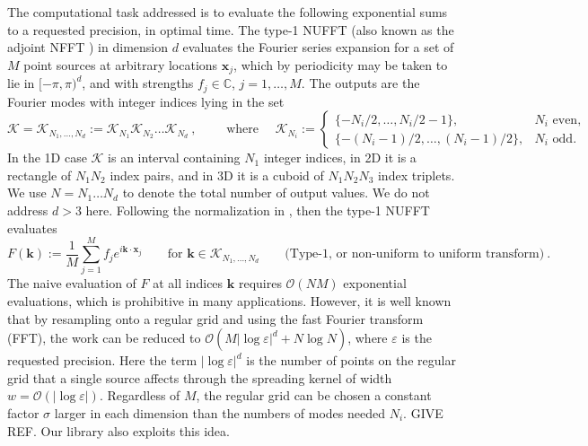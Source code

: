 \documentclass[10pt]{article}
\newcommand{\be}{\begin{equation}}
\newcommand{\ee}{\end{equation}}
\newcommand{\mbf}[1]{{\mathbf #1}}
\newcommand{\eps}{\varepsilon}
\newcommand{\bigO}{{\mathcal O}}
\newcommand{\xx}{\mbf{x}}
\newcommand{\kk}{\mbf{k}}
\newcommand{\KK}{{\mathcal K}}
\newcommand{\NU}{{non-uniform}}
\newcommand{\U}{{uniform}}
\begin{document}
The computational task addressed
is to evaluate the following exponential sums to a requested precision,
in optimal time.
The type-1 NUFFT (also known as the adjoint NFFT \cite{usingnfft})
in dimension $d$ %
evaluates the Fourier series expansion for a set of
$M$ point sources at arbitrary locations $\xx_j$, which by periodicity
may be taken to lie in $[-\pi,\pi)^d$, and with
strengths $f_j\in\mathbb{C}$,  $j=1,\dots,M$.
The outputs are the Fourier modes with integer indices lying in
the set
\be
\KK = \KK_{N_1,\dots,N_d} := \KK_{N_1} \KK_{N_2} \dots \KK_{N_d}~,
\qquad\mbox{ where } \quad
\KK_{N_i} := \left\{\begin{array}{ll} \{-N_i/2,\ldots,N_i/2-1\}, & N_i \mbox{ even},\\
\{-(N_i-1)/2,\ldots,(N_i-1)/2\}, & N_i \mbox{ odd}.
\end{array}\right.
\label{KK}
\ee
In the 1D case $\KK$ is an interval containing $N_1$ integer indices, in 2D it is a rectangle of $N_1N_2$ index pairs, and in 3D it is a cuboid of $N_1N_2N_3$ index triplets.
We use $N=N_1\dots N_d$ to denote the total number of output values.
We do not address $d>3$ here.
Following the normalization in \cite{dutt,nufft}, then the type-1 NUFFT
evaluates
\be
F(\kk) := \frac{1}{M} \sum_{j=1}^M f_j e^{i \kk\cdot \xx_j}
\qquad \mbox{for } \kk \in \KK_{N_1,\dots,N_d}
\qquad \mbox{(Type-1, or \NU\ to \U\ transform)}
~.
\label{1}
\ee
The naive evaluation of $F$ at all indices $\kk$ requires $\bigO(NM)$
exponential evaluations, which is prohibitive
in many applications.
However, it is well known that by resampling onto a regular
grid and using the fast Fourier transform (FFT),
the work can be reduced to $\bigO(M |\log\eps|^d + N \log N)$,
where $\eps$ is the requested precision.
Here the term $|\log\eps|^d$ is the number of points on the regular
grid that a single source affects through the spreading kernel
of width $w=\bigO(|\log\eps|)$.
Regardless of $M$, the regular grid can be chosen a constant factor
$\sigma$ larger in each dimension than the numbers of modes needed $N_i$.
GIVE REF.
Our library also exploits this idea.
\end{document}
